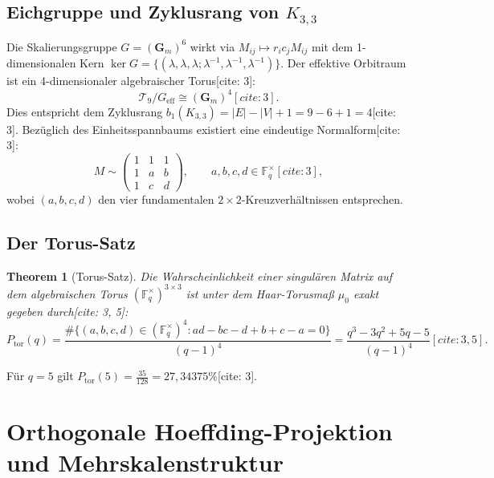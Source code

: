 \documentclass[11pt,a4paper]{article}
\newtheorem{theorem}{Theorem}[section]
\theoremstyle{definition}
\theoremstyle{remark}
\begin{document}
\subsection{Eichgruppe und Zyklusrang von $K_{3,3}$}
Die Skalierungsgruppe $G = (\mathbf{G}_m)^6$ wirkt via $M_{ij} \mapsto r_i c_j M_{ij}$ mit dem 1-dimensionalen Kern $\ker G = \{(\lambda, \lambda, \lambda; \lambda^{-1}, \lambda^{-1}, \lambda^{-1})\}$. Der effektive Orbitraum ist ein 4-dimensionaler algebraischer Torus[cite: 3]:
\begin{equation}
\mathcal{T}_9 / G_{\mathrm{eff}} \cong (\mathbf{G}_m)^4[cite: 3].
\end{equation}
Dies entspricht dem Zyklusrang $b_1(K_{3,3}) = |E| - |V| + 1 = 9 - 6 + 1 = 4$[cite: 3]. Bezüglich des Einheitsspannbaums existiert eine eindeutige Normalform[cite: 3]:
\begin{equation}
M \sim \begin{pmatrix} 1 & 1 & 1 \\ 1 & a & b \\ 1 & c & d \end{pmatrix}, \qquad a, b, c, d \in \mathbb{F}_q^\times[cite: 3],
\end{equation}
wobei $(a, b, c, d)$ den vier fundamentalen $2\times 2$-Kreuzverhältnissen entsprechen.

\subsection{Der Torus-Satz}
\begin{theorem}[Torus-Satz]
Die Wahrscheinlichkeit einer singulären Matrix auf dem algebraischen Torus $(\mathbb{F}_q^\times)^{3\times 3}$ ist unter dem Haar-Torusmaß $\mu_0$ exakt gegeben durch[cite: 3, 5]:
\begin{equation}
\boxed{P_{\mathrm{tor}}(q) = \frac{\#\{(a,b,c,d) \in (\mathbb{F}_q^\times)^4 : ad - bc - d + b + c - a = 0\}}{(q-1)^4} = \frac{q^3 - 3q^2 + 5q - 5}{(q-1)^4}}[cite: 3, 5].
\end{equation}
\end{theorem}
Für $q = 5$ gilt $P_{\mathrm{tor}}(5) = \frac{35}{128} = 27{,}34375\%$[cite: 3].

\section{Orthogonale Hoeffding-Projektion und Mehrskalenstruktur}
\end{document}
